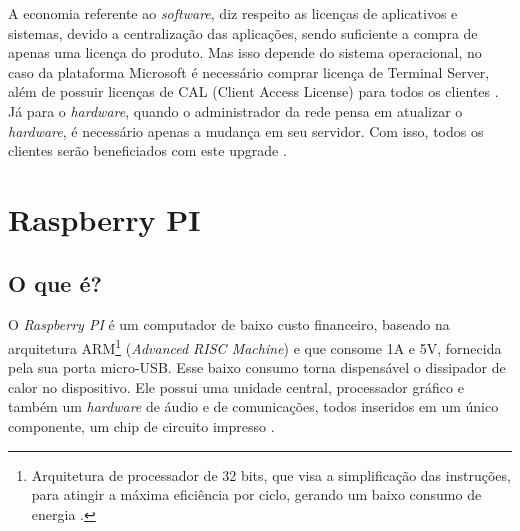 \documentclass[
	12pt,				%
	openright,			%
	twoside,			%
	a4paper,			%
	chapter=TITLE,		%
	english,			%
	brazil				%
	]{abntex2}
\begin{document}
A economia referente ao \textit{software}, diz respeito as licenças de aplicativos e sistemas, devido a centralização das aplicações, sendo suficiente a compra de apenas uma licença do produto. Mas isso depende do sistema operacional, no caso da plataforma Microsoft é necessário comprar licença de Terminal Server, além de possuir licenças de CAL (Client Access License) para todos os clientes \cite{microsoft}. Já para o \textit{hardware}, quando o administrador da rede pensa em atualizar o \textit{hardware}, é necessário apenas a mudança em seu servidor. Com isso, todos os clientes serão beneficiados com este upgrade \cite{EmailThinClient}.


\begin{table}[h!]
\end{table}

\newpage



\chapter{Raspberry PI}
\label{refe:raspberry}

\section{O que é?}


O \textit{Raspberry PI} é um computador de baixo custo financeiro, baseado na arquitetura ARM\footnote{Arquitetura de processador de 32 bits, que visa a simplificação das instruções, para atingir a máxima eficiência por ciclo, gerando um baixo consumo de energia \cite{arm}.} (\textit{Advanced RISC Machine}) e que consome 1A e 5V, fornecida pela sua porta micro-USB. Esse baixo consumo torna dispensável o dissipador de calor no dispositivo. Ele possui uma unidade central, processador gráfico e também um \textit{hardware} de áudio e de comunicações, todos inseridos em um único componente, um chip de circuito impresso \cite{eben2013raspberry, raspberrypi.org}.
\end{document}
